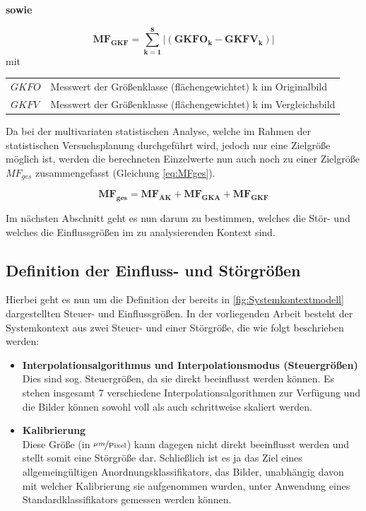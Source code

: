 \documentclass[
fontsize=10pt, 
listof = totoc,
parskip = half	
]{report}
\makeatletter
\newenvironment{conditions}
{\par\vspace{\abovedisplayskip}\noindent\begin{tabular}{>{$}l<{$} @{${}:{}$} l}}
	{\end{tabular}\par\vspace{\belowdisplayskip}}
\makeatother
\begin{document}
\noindent \textbf{sowie}

\begin{equation}\label{eq:MFGKf}
	\boxed{\mathbf{MF_{GKF} = \sum_{k=1}^{8} |\left(GKFO_k - GKFV_k\right)|}}
\end{equation}
mit
\begin{conditions}
	GKFO	&	Messwert der Größenklasse (flächengewichtet) k im Originalbild\\
	GKFV	&	Messwert der Größenklasse (flächengewichtet) k im  Vergleichsbild
\end{conditions}

\noindent Da bei der multivariaten statistischen Analyse, welche im Rahmen der statistischen Versuchsplanung durchgeführt wird, jedoch nur eine Zielgröße möglich ist, werden die berechneten Einzelwerte nun auch noch zu einer Zielgröße $MF_{ges}$ zusammengefasst (Gleichung \ref{eq:MFges}).

\begin{equation}\label{eq:MFges}
	\boxed{\mathbf{MF_{ges} = MF_{AK} + MF_{GKA} + MF_{GKF}}}
\end{equation}

\noindent Im nächsten Abschnitt geht es nun darum zu bestimmen, welches die Stör- und welches die Einflussgrößen im zu analysierenden Kontext sind.

\subsection{Definition der Einfluss- und Störgrößen}

Hierbei geht es nun um die Definition der bereits in \ref{fig:Systemkontextmodell} dargestellten Steuer- und Einflussgrößen. In der vorliegenden Arbeit besteht der Systemkontext aus zwei Steuer- und einer Störgröße, die wie folgt beschrieben werden:

\begin{itemize}
	\item \textbf{Interpolationsalgorithmus und Interpolationsmodus (Steuergrößen)} \\
	Dies sind sog. Steuergrößen, da sie direkt beeinflusst werden können. Es stehen insgesamt 7 verschiedene Interpolationsalgorithmen zur Verfügung und die Bilder können sowohl voll als auch schrittweise skaliert werden.
	\item \textbf{Kalibrierung} \\
	Diese Größe (in $\nicefrac{\mu m}{\text{Pixel}}$) kann dagegen nicht direkt beeinflusst werden und stellt somit eine Störgröße dar. Schließlich ist es ja das Ziel eines allgemeingültigen Anordnungsklassifikators, das Bilder, unabhängig davon mit welcher Kalibrierung sie aufgenommen wurden, unter Anwendung eines Standardklassifikators gemessen werden können.
\end{itemize}
\end{document}
